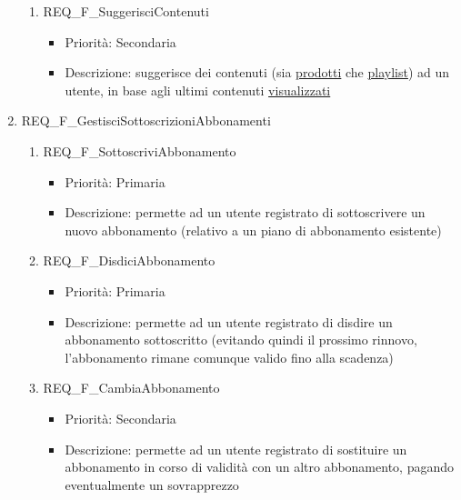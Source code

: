 \begin{enumerate}
\begin{enumerate}[label*=\arabic*.]
		\item REQ\_F\_SuggerisciContenuti
			\begin{itemize}	
			\item Priorità: Secondaria
			\item Descrizione: suggerisce dei contenuti (sia \hyperlink{AnReqProdMult}{prodotti} che \hyperlink{AnReqPlaylist}{playlist})  ad un utente, in base agli ultimi contenuti \hyperlink{AnReqVisual}{visualizzati}
			\end{itemize}
		\end{enumerate}		

	\item REQ\_F\_GestisciSottoscrizioniAbbonamenti
		\begin{enumerate}[label*=\arabic*.]			
		\item REQ\_F\_SottoscriviAbbonamento
			\begin{itemize}
			\item Priorità: Primaria	
			\item Descrizione: permette ad un utente registrato di sottoscrivere un nuovo abbonamento (relativo a un piano di abbonamento esistente)
			\end{itemize}

		\item REQ\_F\_DisdiciAbbonamento
			\begin{itemize}	
			\item Priorità: Primaria
			\item Descrizione: permette ad un utente registrato di disdire un abbonamento sottoscritto (evitando quindi il prossimo rinnovo, l'abbonamento rimane comunque valido fino alla scadenza)
			\end{itemize}
				
		\item REQ\_F\_CambiaAbbonamento
			\begin{itemize}	
			\item Priorità: Secondaria
			\item Descrizione: permette ad un utente registrato di sostituire un abbonamento in corso di validità con un altro abbonamento, pagando eventualmente un sovrapprezzo
			\end{itemize}
		\end{enumerate}
	
	

\end{enumerate}
